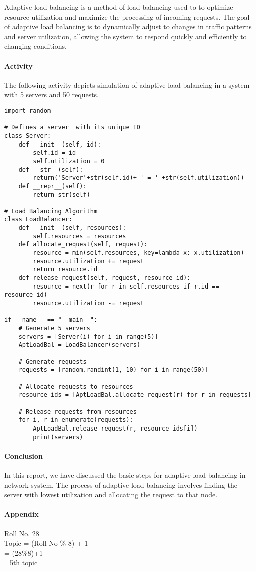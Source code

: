 \documentclass[12pt]{article}
\begin{document}
Adaptive load balancing is a method of load balancing used to 
to optimize resource utilization and maximize the processing of incoming requests. 
The goal of adaptive load balancing is to dynamically adjust to changes in traffic patterns and server utilization, allowing the system to respond quickly and efficiently to changing conditions. 

\paragraph{Activity}
The following activity depicts simulation of adaptive load balancing in a system with 5 servers and 50 requests.
\begin{verbatim}
import random

# Defines a server  with its unique ID
class Server:
    def __init__(self, id):
        self.id = id
        self.utilization = 0       
    def __str__(self):
        return('Server'+str(self.id)+ ' = ' +str(self.utilization))
    def __repr__(self):
        return str(self)

# Load Balancing Algorithm
class LoadBalancer:
    def __init__(self, resources):
        self.resources = resources
    def allocate_request(self, request):
        resource = min(self.resources, key=lambda x: x.utilization)
        resource.utilization += request
        return resource.id
    def release_request(self, request, resource_id):
        resource = next(r for r in self.resources if r.id == resource_id)
        resource.utilization -= request
          
if __name__ == "__main__":
    # Generate 5 servers
    servers = [Server(i) for i in range(5)]
    AptLoadBal = LoadBalancer(servers)

    # Generate requests
    requests = [random.randint(1, 10) for i in range(50)]

    # Allocate requests to resources
    resource_ids = [AptLoadBal.allocate_request(r) for r in requests]

    # Release requests from resources
    for i, r in enumerate(requests):
        AptLoadBal.release_request(r, resource_ids[i])
        print(servers)
\end{verbatim}

\paragraph{Conclusion\\}
In this report, we have discussed the basic steps for adaptive load balancing in network system. 
The process of adaptive load balancing involves finding the server with lowest utilization 
and allocating the request to that node.

\paragraph{Appendix\\}
Roll No. 28 \\
Topic = (Roll No \% 8) + 1 \\ = (28\%8)+1 \\ =5th topic
\end{document}
